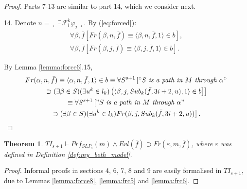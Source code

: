 \documentclass{asl}
\newtheorem{theorem}{Theorem}[section]
\theoremstyle{definition}
\begin{document}
\begin{proof}
Parts 7-13 are similar to part 14, which we consider next.

14. Denote $n=\llcorner \exists \mathcal{F}_i^k\varphi_j \lrcorner$. By (\ref{eq:forced}):
\begin{eqnarray*}
\forall\beta,\bar{f} \left[Fr(\beta,n,\bar{f})\equiv\langle \beta,n,\bar{f},1\rangle\in b\right] ,
\\
\forall\beta,\bar{f} \left[Fr(\beta,j,\bar{f})\equiv\langle \beta,j,\bar{f},1\rangle\in b\right].
\end{eqnarray*}

By Lemma \ref{lemma:force6}.15,
\begin{multline*}
Fr(\alpha,n,\bar{f})
\equiv \langle \alpha,n,\bar{f},1\rangle \in b\equiv
\forall S^{s+1}\left["S\textit{ is a path in }M\textit{ through }\alpha" 
\right.
\\
\left.
\supset(\exists\beta\in S)(\exists u^k\in l_k)
\left(\langle \beta,j,Sub_k(\bar{f},3i+2,u),1\rangle \in b \right]\right]
\\
\equiv
\forall S^{s+1}\left["S\textit{ is a path in }M\textit{ through }\alpha" 
\right.
\\
\left.
\supset(\exists\beta\in S)(\exists u^k\in l_k)
Fr(\beta,j,Sub_k(\bar{f},3i+2,u))\right].
\end{multline*} 
\end{proof}

\begin{theorem}
$TI_{s+1}\vdash Prf_{SLP_s}(m)\wedge Evl(\bar{f})\supset Fr(\varepsilon,m,\bar{f})$, where $\varepsilon$ was defined in Definition \ref{def:my_beth_model}.
\label{theorem:force1}
\end{theorem}

\begin{proof}
Informal proofs in sections 4, 6, 7, 8 and 9 are easily formalised in $TI_{s+1}$, due to Lemmas \ref{lemma:force8}, \ref{lemma:frc5} and \ref{lemma:frc6}.
\end{proof}
\end{document}
